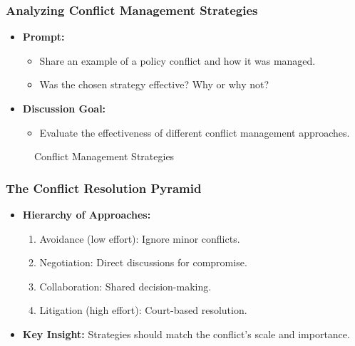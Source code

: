 \documentclass[10pt]{beamer}
\begin{document}
\begin{frame}
            \begin{frame}
            \frametitle{Analyzing Conflict Management Strategies}
            \begin{itemize}
                \item \textbf{Prompt:}
                    \begin{itemize}
                        \item Share an example of a policy conflict and how it was managed.
                        \item Was the chosen strategy effective? Why or why not?
                    \end{itemize}
                \item \textbf{Discussion Goal:}
                    \begin{itemize}
                        \item Evaluate the effectiveness of different conflict management approaches.
                    \end{itemize}
            \end{itemize}
            
            \begin{figure}
                \centering
                \caption{Conflict Management Strategies}
            \end{figure}
            \end{frame}
            
            \begin{frame}
            \frametitle{The Conflict Resolution Pyramid}
            \begin{itemize}
                \item \textbf{Hierarchy of Approaches:}
                    \begin{enumerate}
                        \item Avoidance (low effort): Ignore minor conflicts.
                        \item Negotiation: Direct discussions for compromise.
                        \item Collaboration: Shared decision-making.
                        \item Litigation (high effort): Court-based resolution.
                    \end{enumerate}
                \item \textbf{Key Insight:} Strategies should match the conflict's scale and importance.
            \end{itemize}
            

\end{frame}
\end{frame}
\end{document}
